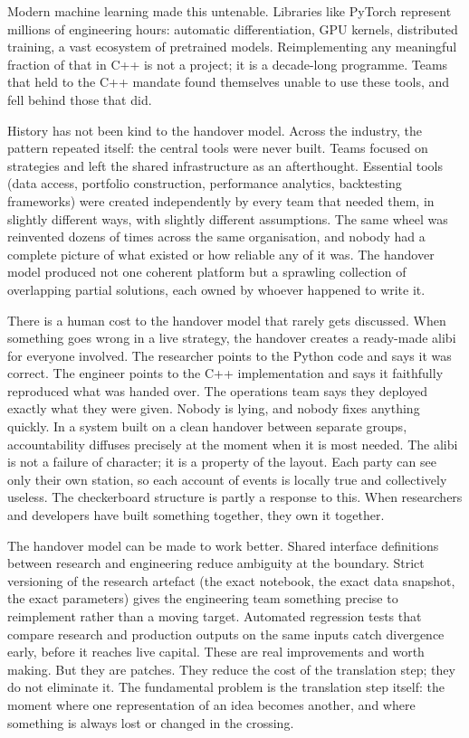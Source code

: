 \documentclass[
  11pt,
]{article}
\begin{document}
Modern machine learning made this untenable. Libraries like PyTorch
represent millions of engineering hours: automatic differentiation, GPU
kernels, distributed training, a vast ecosystem of pretrained models.
Reimplementing any meaningful fraction of that in C++ is not a project;
it is a decade-long programme. Teams that held to the C++ mandate found
themselves unable to use these tools, and fell behind those that did.

History has not been kind to the handover model. Across the industry,
the pattern repeated itself: the central tools were never built. Teams
focused on strategies and left the shared infrastructure as an
afterthought. Essential tools (data access, portfolio construction,
performance analytics, backtesting frameworks) were created
independently by every team that needed them, in slightly different
ways, with slightly different assumptions. The same wheel was reinvented
dozens of times across the same organisation, and nobody had a complete
picture of what existed or how reliable any of it was. The handover
model produced not one coherent platform but a sprawling collection of
overlapping partial solutions, each owned by whoever happened to write
it.

There is a human cost to the handover model that rarely gets discussed.
When something goes wrong in a live strategy, the handover creates a
ready-made alibi for everyone involved. The researcher points to the
Python code and says it was correct. The engineer points to the C++
implementation and says it faithfully reproduced what was handed over.
The operations team says they deployed exactly what they were given.
Nobody is lying, and nobody fixes anything quickly. In a system built on
a clean handover between separate groups, accountability diffuses
precisely at the moment when it is most needed. The alibi is not a
failure of character; it is a property of the layout. Each party can see
only their own station, so each account of events is locally true and
collectively useless. The checkerboard structure is partly a response to
this. When researchers and developers have built something together,
they own it together.

The handover model can be made to work better. Shared interface
definitions between research and engineering reduce ambiguity at the
boundary. Strict versioning of the research artefact (the exact
notebook, the exact data snapshot, the exact parameters) gives the
engineering team something precise to reimplement rather than a moving
target. Automated regression tests that compare research and production
outputs on the same inputs catch divergence early, before it reaches
live capital. These are real improvements and worth making. But they are
patches. They reduce the cost of the translation step; they do not
eliminate it. The fundamental problem is the translation step itself:
the moment where one representation of an idea becomes another, and
where something is always lost or changed in the crossing.
\end{document}
